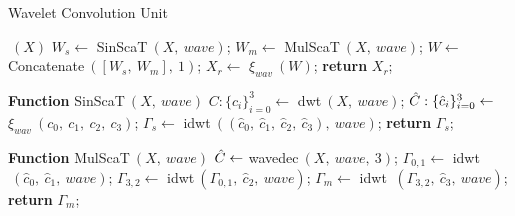 \begin{algorithm}[ht]
\caption{Wavelet Convolution Unit}\label{paper3algorithmWCU}
\begin{algorithmic}[1]
$~(X)$
\State \hspace{0.5cm}$W_s \gets$ SinScaT$~(X,~wave)$;
\State \hspace{0.5cm}$W_m \gets$ MulScaT$~(X,~wave)$;
\State \hspace{0.5cm}$W \gets$ Concatenate$~([W_s,~W_m],~1)$;
\State \hspace{0.5cm}$X_r \gets$ $\xi_{wav}~(W)$;
\State \hspace{0.5cm}\textbf{return} $X_r$;

\State \textbf{Function} {SinScaT}$~(X,~wave)$
\State \hspace{0.5cm}$C:\{c_i\}_{i=0}^3 \gets$ dwt$~(X,~wave)$;
\State \hspace{0.5cm}$\Hat{C}:\{\hat{c}_i\}_{i=0}^3 \gets$ $\xi_{wav}~({c}_0,~{c}_1,~{c}_2,~{c}_3)$;
\State \hspace{0.5cm}$\Gamma_s \gets$ idwt$~((\hat{c}_0,~\hat{c}_1,~\hat{c}_2,~\hat{c}_3),~wave)$;
\State \hspace{0.5cm}\textbf{return} $\Gamma_s$;

\State \textbf{Function} {MulScaT}$~(X,~wave)$
\State \hspace{0.5cm}$\Hat{C} \gets$  wavedec$~(X,~wave,~3)$;
\State \hspace{0.5cm}$\Gamma_{0,1} \gets$ idwt$~(\hat{c}_0,~\hat{c}_1,~wave)$;
\State \hspace{0.5cm}$\Gamma_{3,2} \gets$ idwt$~(\Gamma_{0,1},~\hat{c}_2,~wave)$;
\State \hspace{0.5cm}$\Gamma_m \gets$ idwt $~(\Gamma_{3,2},~\hat{c}_3,~wave)$;
\State \hspace{0.5cm}\textbf{return} $\Gamma_m$;
\end{algorithmic}
\label{alg1}
\end{algorithm}

